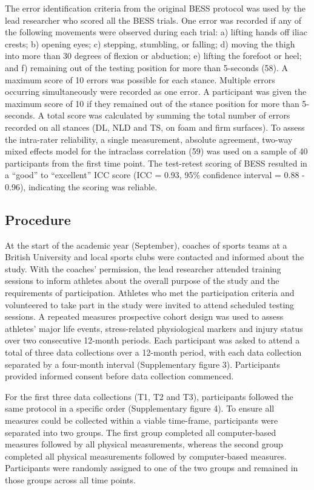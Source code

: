 \documentclass[
  english,
  man]{apa6}
\begin{document}
The error identification criteria from the original BESS protocol was used by the lead researcher who scored all the BESS trials.
One error was recorded if any of the following movements were observed during each trial: a) lifting hands off iliac crests;
b) opening eyes;
c) stepping, stumbling, or falling;
d) moving the thigh into more than 30 degrees of flexion or abduction;
e) lifting the forefoot or heel; and
f) remaining out of the testing position for more than 5-seconds (58).
A maximum score of 10 errors was possible for each stance. Multiple errors occurring simultaneously were recorded as one error.
A participant was given the maximum score of 10 if they remained out of the stance position for more than 5-seconds.
A total score was calculated by summing the total number of errors recorded on all stances (DL, NLD and TS, on foam and firm surfaces).
To assess the intra-rater reliability, a single measurement, absolute agreement, two-way mixed effects model for the intraclass correlation (59) was used on a sample of 40 participants from the first time point.
The test-retest scoring of BESS resulted in a ``good'' to ``excellent'' ICC score (ICC = 0.93, 95\% confidence interval = 0.88 - 0.96), indicating the scoring was reliable.

\hypertarget{procedure}{%
\subsection{Procedure}\label{procedure}}

At the start of the academic year (September), coaches of sports teams at a British University and local sports clubs were contacted and informed about the study. With the coaches' permission, the lead researcher attended training sessions to inform athletes about the overall purpose of the study and the requirements of participation. Athletes who met the participation criteria and volunteered to take part in the study were invited to attend scheduled testing sessions. A repeated measures prospective cohort design was used to assess athletes' major life events, stress-related physiological markers and injury status over two consecutive 12-month periods. Each participant was asked to attend a total of three data collections over a 12-month period, with each data collection separated by a four-month interval (Supplementary figure 3). Participants provided informed consent before data collection commenced.

For the first three data collections (T1, T2 and T3), participants followed the same protocol in a specific order (Supplementary figure 4).
To ensure all measures could be collected within a viable time-frame, participants were separated into two groups.
The first group completed all computer-based measures followed by all physical measurements, whereas the second group completed all physical measurements followed by computer-based measures.
Participants were randomly assigned to one of the two groups and remained in those groups across all time points.
\end{document}
